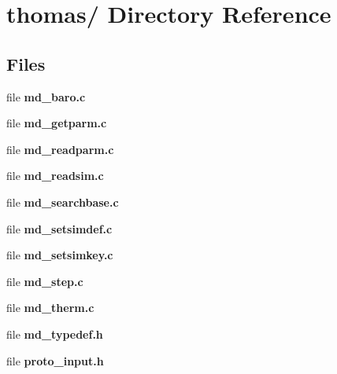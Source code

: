 \section{thomas/ Directory Reference}
\label{dir_6a7eacd7a1637ea9d7310abecf906ff6}
\subsection*{Files}
\begin{CompactItemize}
\item 
file {\bf md\_\-baro.c}
\item 
file {\bf md\_\-getparm.c}
\item 
file {\bf md\_\-readparm.c}
\item 
file {\bf md\_\-readsim.c}
\item 
file {\bf md\_\-searchbase.c}
\item 
file {\bf md\_\-setsimdef.c}
\item 
file {\bf md\_\-setsimkey.c}
\item 
file {\bf md\_\-step.c}
\item 
file {\bf md\_\-therm.c}
\item 
file {\bf md\_\-typedef.h}
\item 
file {\bf proto\_\-input.h}
\end{CompactItemize}
